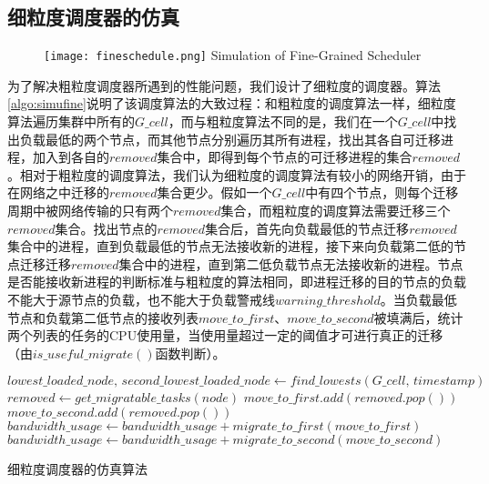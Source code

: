 \subsection{细粒度调度器的仿真}
\begin{figure}[!htp]
  \centering
  \texttt{[image: fineschedule.png]}
    {Simulation of Fine-Grained Scheduler}
  \label{fig:simufine}
\end{figure}
为了解决粗粒度调度器所遇到的性能问题，我们设计了细粒度的调度器。算法\ref{algo:simufine}说明了该调度算法的大致过程：和粗粒度的调度算法一样，细粒度算法遍历集群中所有的$G\_cell$，而与粗粒度算法不同的是，我们在一个$G\_cell$中找出负载最低的两个节点，而其他节点分别遍历其所有进程，找出其各自可迁移进程，加入到各自的$removed$集合中，即得到每个节点的可迁移进程的集合$removed$。相对于粗粒度的调度算法，我们认为细粒度的调度算法有较小的网络开销，由于在网络之中迁移的$removed$集合更少。假如一个$G\_cell$中有四个节点，则每个迁移周期中被网络传输的只有两个$removed$集合，而粗粒度的调度算法需要迁移三个$removed$集合。找出节点的$removed$集合后，首先向负载最低的节点迁移$removed$集合中的进程，直到负载最低的节点无法接收新的进程，接下来向负载第二低的节点迁移迁移$removed$集合中的进程，直到第二低负载节点无法接收新的进程。节点是否能接收新进程的判断标准与粗粒度的算法相同，即进程迁移的目的节点的负载不能大于源节点的负载，也不能大于负载警戒线$warning\_threshold$。当负载最低节点和负载第二低节点的接收列表$move\_to\_first$、$move\_to\_second$被填满后，统计两个列表的任务的CPU使用量，当使用量超过一定的阈值才可进行真正的迁移（由$is\_useful\_migrate()$函数判断）。
\begin{algorithm}[h]
\begin{algorithmic}[1]
\State $lowest\_loaded\_node,\,second\_lowest\_loaded\_node \gets find\_lowests(G\_cell,\, timestamp)$
\State
{}
\State $removed \gets get\_migratable\_tasks(node)$
\State $move\_to\_first.add(removed.pop())$
\EndWhile
{}
\State $move\_to\_second.add(removed.pop())$
\EndWhile
\State
{}
\State $bandwidth\_usage \gets bandwidth\_usage + migrate\_to\_first(move\_to\_first)$
\EndIf
{}
\State $bandwidth\_usage \gets bandwidth\_usage + migrate\_to\_second(move\_to\_second)$
\EndIf
\EndFor
\EndFor
\end{algorithmic}
\caption{细粒度调度器的仿真算法}
\label{algo:simufine}
\end{algorithm}

